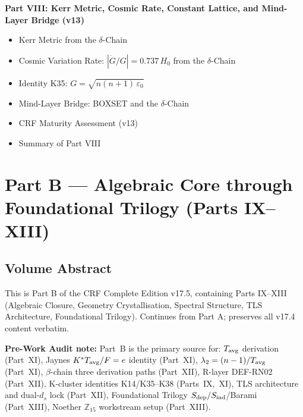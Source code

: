 \documentclass[11pt, a4paper]{article}
\begin{document}
\begin{contentsbox}[title={Part A --- Part and Section Headers}]
\textbf{Part VIII: Kerr Metric, Cosmic Rate, Constant Lattice, and Mind-Layer Bridge (v13)}
\begin{itemize}[noitemsep,leftmargin=1.5em]
  \item Kerr Metric from the $\delta$-Chain
  \item Cosmic Variation Rate: $|\dot{G}/G| = 0.737\,H_0$ from the $\delta$-Chain
  \item Identity K35: $G = \sqrt{n(n+1)\,\varepsilon_0}$
  \item Mind-Layer Bridge: BOXSET and the $\delta$-Chain
  \item CRF Maturity Assessment (v13)
  \item Summary of Part VIII
\end{itemize}
\end{contentsbox}

\newpage

\section{Part B --- Algebraic Core through Foundational Trilogy (Parts IX--XIII)}

\subsection*{Volume Abstract}

\begin{volumebox}[title={Part B --- CRF Complete Edition v17.5 (Parts IX--XIII)}]
This is Part B of the CRF Complete Edition v17.5, containing Parts IX--XIII
(Algebraic Closure, Geometry Crystallisation, Spectral Structure, TLS Architecture,
Foundational Trilogy). Continues from Part A; preserves all v17.4 content verbatim.

\medskip
\textbf{Pre-Work Audit note:} Part~B is the primary source for:
$T_{\rm avg}$ derivation (Part~XI), Jaynes $K^*T_{\rm avg}/F = e$ identity (Part~XI),
$\lambda_2 = (n-1)/T_{\rm avg}$ (Part~XI), $\beta$-chain three derivation paths (Part~XII),
R-layer DEF-RN02 (Part~XII), K-cluster identities K14/K35--K38 (Parts~IX,~XI),
TLS architecture and dual-$d_s$ lock (Part~XII), Foundational Trilogy
$S_{\rm dep}/S_{\rm ind}$/Barami (Part~XIII), Noether $\mathbb{Z}_{15}$ workstream
setup (Part~XIII).
\end{volumebox}
\end{document}
